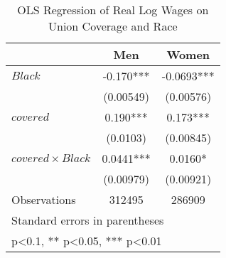 \begin{table}[htbp]\centering
\def\sym#1{\ifmmode^{#1}\else\(^{#1}\)\fi}
\caption{OLS Regression of Real Log Wages on Union Coverage and Race}
\begin{tabular}{l*{2}{c}}
\hline\hline
                    &\multicolumn{1}{c}{Men}&\multicolumn{1}{c}{Women}\\
\hline
$ Black $           &      -0.170***&     -0.0693***\\
                    &   (0.00549)   &   (0.00576)   \\
[1em]
$ covered $         &       0.190***&       0.173***\\
                    &    (0.0103)   &   (0.00845)   \\
[1em]
$ covered \times Black $&      0.0441***&      0.0160*  \\
                    &   (0.00979)   &   (0.00921)   \\
\hline
Observations        &      312495   &      286909   \\
\hline\hline
\multicolumn{3}{l}{\footnotesize Standard errors in parentheses}\\
\multicolumn{3}{l}{\footnotesize * p<0.1, ** p<0.05, *** p<0.01}\\
\end{tabular}
\end{table}
